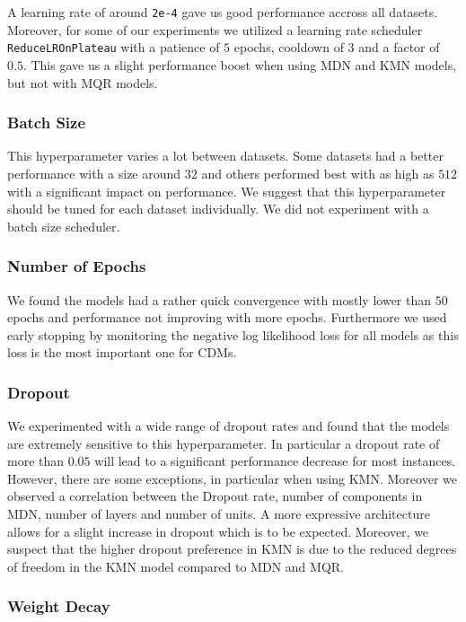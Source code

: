 A learning rate of around \texttt{2e-4} gave us good performance accross all datasets. Moreover, for some of our experiments we utilized a learning rate scheduler \texttt{ReduceLROnPlateau} with a patience of $5$ epochs, cooldown of $3$ and a factor of $0.5$. This gave us a slight performance boost when using MDN and KMN models, but not with MQR models.

\subsubsection{Batch Size}

This hyperparameter varies a lot between datasets. Some datasets had a better performance with a size around $32$ and others performed best with as high as $512$ with a significant impact on performance. We suggest that this hyperparameter should be tuned for each dataset individually. We did not experiment with a batch size scheduler.

\subsubsection{Number of Epochs}

We found the models had a rather quick convergence with mostly lower than $50$ epochs and performance not improving with more epochs. Furthermore we used early stopping by monitoring the negative log likelihood loss for all models as this loss is the most important one for CDMs.

\subsubsection{Dropout}

We experimented with a wide range of dropout rates and found that the models are extremely sensitive to this hyperparameter. In particular a dropout rate of more than $0.05$ will lead to a significant performance decrease for most instances. However, there are some exceptions, in particular when using KMN. Moreover we observed a correlation between the Dropout rate, number of components in MDN, number of layers and number of units. A more expressive architecture allows for a slight increase in dropout which is to be expected. Moreover, we suspect that the higher dropout preference in KMN is due to the reduced degrees of freedom in the KMN model compared to MDN and MQR.

\subsubsection{Weight Decay}

